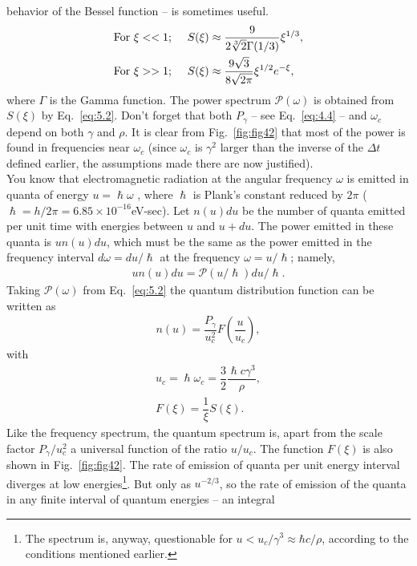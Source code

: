 behavior of the Bessel function -- is sometimes useful.
\begin{align} \label{eq:5.6}
	\text{For }\xi << 1; \hspace{5mm} & S(\xi) \approx \dfrac{9}{2\sqrt[3]{2}\Gamma(1/3)} \xi^{1/3}, \\
    \text{For }\xi >> 1; \hspace{5mm} & S(\xi) \approx \dfrac{9\sqrt{3}}{8 \sqrt{2\pi}} \xi^{1/2} e^{-\xi},
\end{align}
 where $\Gamma$ is the Gamma function. The power spectrum $\mathscr{P}(\omega)$ is obtained from $S(\xi)$ by Eq.~\eqref{eq:5.2}. Don't forget that both $P_\gamma$ -- see Eq.~\eqref{eq:4.4} -- and $\omega_c$ depend on both $\gamma$ and $\rho$. It is clear from Fig.~\ref{fig:fig42} that most of the power is found in frequencies near $\omega_c$ (since $\omega_c$ is $\gamma^2$ larger
 than the inverse of the $\Delta t$ defined earlier, the assumptions made there are now justified).\\
You know that electromagnetic radiation at the angular frequency $\omega$ is emitted in quanta of energy $u = \hslash \omega$ , where $\hslash$ is Plank's constant reduced by $2\pi$ ($\hslash = h/2\pi = 6.85 \times 10^{-16}$eV-sec). Let $n(u)du$ be the number of quanta emitted per unit time with energies between $u$ and $u + du$. The power emitted in these quanta is $un(u)du$,
which must be the same as the power emitted in the frequency interval $d\omega = du/\hslash$
at the frequency $\omega = u/\hslash$; namely,
\begin{align}
	u n(u) du = \mathscr{P}(u/\hslash)du/\hslash.
\end{align}
Taking $\mathscr{P}(\omega)$ from Eq.~\eqref{eq:5.2} the quantum distribution function can be written as
\begin{align}
	n(u) = \dfrac{P_\gamma}{u_c^2} F\left( \dfrac{u}{u_c} \right),
\end{align}
with
\begin{align} \label{eq:5.9}
	u_c = \hslash \omega_c = \dfrac{3}{2} \dfrac{\hslash c \gamma^3}{\rho},\\
    F(\xi) = \dfrac{1}{\xi}S(\xi).
\end{align}
Like the frequency spectrum, the quantum spectrum is, apart from the scale factor $P_\gamma/u_c^2$ a universal function of the ratio $u/u_c$.
The function $F(\xi)$ is also shown in Fig.~\ref{fig:fig42}. The rate of emission of quanta per unit energy interval diverges at low energies\footnote{The spectrum is, anyway, questionable for $u < u_c/\gamma^3 \approx \hbar c/\rho$, according to the conditions mentioned earlier.}. But only as $u^{-2/3}$, so the rate of emission of the quanta in any finite interval of quantum energies -- an integral
